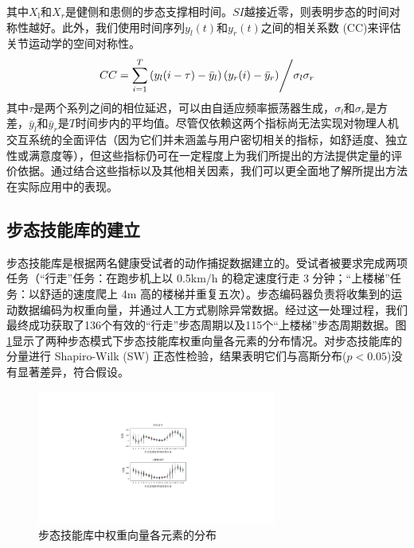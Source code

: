 其中${X_{\text{l}}}$和${X_r}$是健侧和患侧的步态支撑相时间。$SI$越接近零，则表明步态的时间对称性越好。此外，我们使用时间序列${y_l(t)}$和${y_r(t)}$之间的相关系数 (CC)\cite{gouwandaIdentifyingGaitAsymmetry2011}来评估关节运动学的空间对称性。
\begin{equation}
\label{deqn_ex22}
CC = {{\sum\limits_{i = 1}^T {\left( {{y_l}(i - \tau) - {{\bar y}_l}} \right)} \left( {{y_r}(i ) - {{\bar y}_r}} \right)} \mathord{\left/
{\vphantom {{\sum\limits_{i = 1}^T {\left( {{y_l}(i) - {{\bar y}_l}} \right)}\left( {{y_r}(i + \tau ) - {{\bar y}_r}} \right)} {{\sigma _l}{\sigma _r}}}} \right.
\kern-\nulldelimiterspace} {{\sigma _l}{\sigma _r}}}
\end{equation}
其中$\tau$是两个系列之间的相位延迟，可以由自适应频率振荡器生成，${\sigma _l}$和${\sigma _r}$是方差，$\bar y_l$和$\bar y_r$是${T}$时间步内的平均值。尽管仅依赖这两个指标尚无法实现对物理人机交互系统的全面评估（因为它们并未涵盖与用户密切相关的指标，如舒适度、独立性或满意度等），但这些指标仍可在一定程度上为我们所提出的方法提供定量的评价依据。通过结合这些指标以及其他相关因素，我们可以更全面地了解所提出方法在实际应用中的表现。

\subsection{步态技能库的建立}步态技能库是根据两名健康受试者的动作捕捉数据建立的。受试者被要求完成两项任务（``行走''任务：在跑步机上以 0.5km/h 的稳定速度行走 3 分钟；``上楼梯''任务：以舒适的速度爬上 4m 高的楼梯并重复五次）。步态编码器负责将收集到的运动数据编码为权重向量，并通过人工方式剔除异常数据。经过这一处理过程，我们最终成功获取了136个有效的``行走''步态周期以及115个``上楼梯''步态周期数据。图\ref{fig:5-3}显示了两种步态模式下步态技能库权重向量各元素的分布情况。对步态技能库的分量进行 Shapiro-Wilk (SW) 正态性检验，结果表明它们与高斯分布($p<0.05$)没有显著差异，符合假设。
\begin{figure}[!t]
  \centering\includegraphics[width=0.7\textwidth]{figures/5-Fig-3.pdf}
  \caption{步态技能库中权重向量各元素的分布}
  \label{fig:5-3}
\end{figure}


